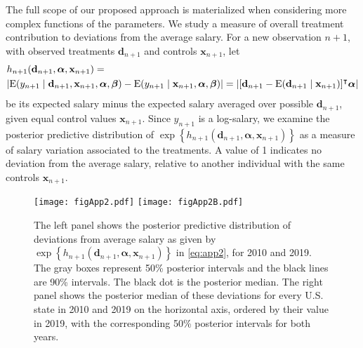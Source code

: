 \documentclass[12pt]{article}
\newcommand{\E}{\mbox{\textup{E}}}
\newcommand{\mb}[1]{\mathbf{#1}}
\newcommand{\tr}[1]{#1^{\intercal}}
\newcommand{\balpha}{{\bm{\alpha}}}
\newcommand{\bbeta}{{\bm{\beta}}}
\begin{document}
The full scope of our proposed approach is materialized when considering more complex functions of the parameters. We study a measure of overall treatment contribution to deviations from the average salary. For a new observation $n+1$, with observed treatments $\mb{d}_{n+1}$ and controls $\mb{x}_{n+1}$, let
\begin{align}
  & h_{n+1}(\mb{d}_{n+1}, \balpha, \mb{x}_{n+1}) = \nonumber \\
  & | \E(y_{n+1} \mid \mb{d}_{n+1}, \mb{x}_{n+1}, \balpha, \bbeta) - \E(y_{n+1} \mid \mb{x}_{n+1}, \balpha, \bbeta) |
= | \tr{[\mb{d}_{n+1} - \E(\mb{d}_{n+1} \mid \mb{x}_{n+1})]} \balpha | \label{eq:app2}
\end{align}
be its expected salary minus the expected salary averaged over possible $\mb{d}_{n+1}$, given equal control values $\mb{x}_{n+1}$.
Since $y_{n+1}$ is a log-salary, we examine the posterior predictive distribution of $\exp \left\{ h_{n+1}(\mb{d}_{n+1}, \balpha, \mb{x}_{n+1}) \right\}$ as a measure of salary variation associated to the treatments. A value of 1 indicates no deviation from the average salary, relative to another individual with the same controls $\mb{x}_{n+1}$.


\begin{figure}[h]
\centering
\texttt{[image: figApp2.pdf]} 
\texttt{[image: figApp2B.pdf]}
\caption{The left panel shows the posterior predictive distribution of deviations from average salary as given by $\exp \left\{ h_{n+1}(\mb{d}_{n+1}, \balpha, \mb{x}_{n+1}) \right\}$ in \eqref{eq:app2}, for 2010 and 2019. The gray boxes represent 50\% posterior intervals and the black lines are 90\% intervals. The black dot is the posterior median. The right panel shows the posterior median of these deviations for every U.S. state in 2010 and 2019 on the horizontal axis, ordered by their value in 2019, with the corresponding 50\% posterior intervals for both years.}
\label{fig:salary_variation}
\end{figure}
\end{document}
